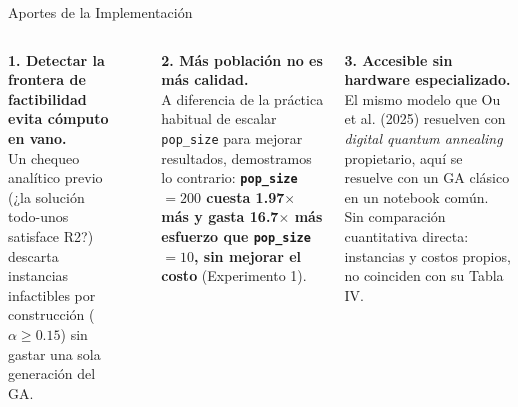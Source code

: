 \documentclass[aspectratio=169, 12pt]{beamer}
\newcommand{\acento}[1]{\textcolor{Verde}{\textbf{#1}}}
\newcommand{\gris}[1]{\textcolor{GrisAzul}{#1}}
\begin{document}
\begin{frame}{Aportes de la Implementación}
  \begin{columns}[T]
    \footnotesize
    \textbf{1. Detectar la frontera de factibilidad evita cómputo en vano.}\\[0.3em]
    {\scriptsize Un chequeo analítico previo (¿la solución todo-unos satisface R2?) descarta instancias infactibles por construcción ($\alpha\geq 0.15$) sin gastar una sola generación del GA.}
    \vspace{0.5em}
    \begin{center}
    \end{center}

    \footnotesize
    \textbf{2. Más población no es más calidad.}\\[0.2em]
    {\scriptsize A diferencia de la práctica habitual de escalar \texttt{pop\_size} para mejorar resultados, demostramos lo contrario: \acento{\texttt{pop\_size}$=200$ cuesta 1.97$\times$ más y gasta 16.7$\times$ más esfuerzo que \texttt{pop\_size}$=10$, sin mejorar el costo} (Experimento 1).}

    \vspace{1.6em}
    \textbf{3. Accesible sin hardware especializado.}\\[0.2em]
    {\scriptsize El mismo modelo que Ou et al. (2025) resuelven con \textit{digital quantum annealing} propietario, aquí se resuelve con un GA clásico en un notebook común. \gris{Sin comparación cuantitativa directa: instancias y costos propios, no coinciden con su Tabla IV.}}
  \end{columns}
\end{frame}
\end{document}

